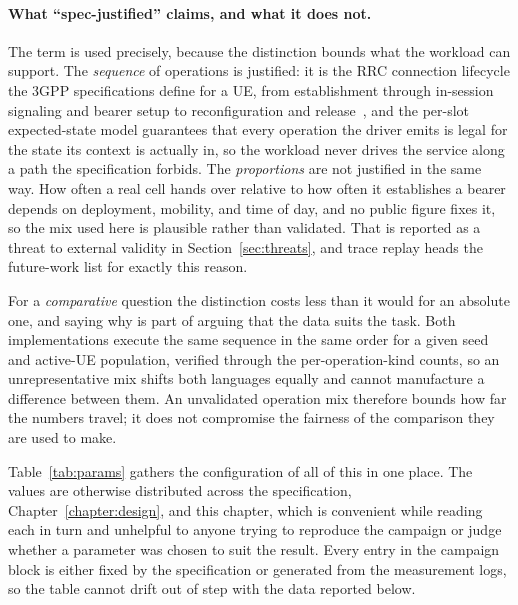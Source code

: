 \documentclass[english,twoside,openright,a4paper,censored,csm,software-track-2020]{HYthesisML}
\begin{document}
\paragraph{What ``spec-justified'' claims, and what it does not.}
The term is used precisely, because the distinction bounds what the workload can support. The
\emph{sequence} of operations is justified: it is the RRC connection lifecycle the 3GPP
specifications define for a UE, from establishment through in-session signaling and bearer setup
to reconfiguration and release~\cite{3gpp38331,3gpp38401}, and the per-slot expected-state model
guarantees that every operation the driver emits is legal for the state its context is actually
in, so the workload never drives the service along a path the specification forbids. The
\emph{proportions} are not justified in the same way. How often a real cell hands over relative
to how often it establishes a bearer depends on deployment, mobility, and time of day, and no
public figure fixes it, so the mix used here is plausible rather than validated. That is
reported as a threat to external validity in Section~\ref{sec:threats}, and trace replay heads
the future-work list for exactly this reason.

For a \emph{comparative} question the distinction costs less than it would for an absolute one,
and saying why is part of arguing that the data suits the task. Both implementations execute the
same sequence in the same order for a given seed and active-UE population, verified through the
per-operation-kind counts, so an unrepresentative mix shifts both languages equally and cannot
manufacture a difference between them. An unvalidated operation mix therefore bounds how far the
numbers travel; it does not compromise the fairness of the comparison they are used to make.

Table~\ref{tab:params} gathers the configuration of all of this in one place. The values are
otherwise distributed across the specification, Chapter~\ref{chapter:design}, and this chapter,
which is convenient while reading each in turn and unhelpful to anyone trying to reproduce the
campaign or judge whether a parameter was chosen to suit the result. Every entry in the
campaign block is either fixed by the specification or generated from the measurement logs, so
the table cannot drift out of step with the data reported below.
\end{document}
